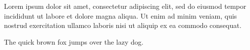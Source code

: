 \documentclass{article}
\begin{document}

Lorem ipsum  dolor sit amet, consectetur adipiscing
elit, sed do eiusmod tempor incididunt ut labore et dolore magna aliqua.
  Ut enim ad minim veniam, quis
nostrud exercitation ullamco laboris nisi ut aliquip ex ea commodo consequat.


The quick brown fox jumps over the lazy dog.
\end{document}
